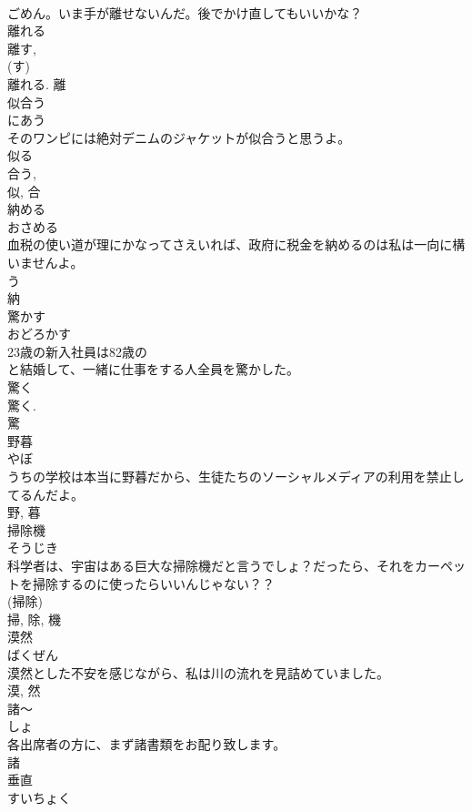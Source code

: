 \documentclass[8pt]{extreport}
\begin{document}
\begin{CJK}{UTF8}{min}
\\	ごめん。いま手が離せないんだ。後でかけ直してもいいかな？	
\\	離れる 
\\	離す, 
\\	(す) 
\\	離れる.	離	
\\	似合う	
\\	にあう	
\\	そのワンピには絶対デニムのジャケットが似合うと思うよ。	
\\	似る 
\\	合う, 
\\	似, 合	
\\	納める	
\\	おさめる	
\\	血税の使い道が理にかなってさえいれば、政府に税金を納めるのは私は一向に構いませんよ。	
\\	う 
\\	納	
\\	驚かす	
\\	おどろかす	
\\	23歳の新入社員は82歳の
\\	と結婚して、一緒に仕事をする人全員を驚かした。	
\\	驚く 
\\	驚く. 
\\	驚	
\\	野暮	
\\	やぼ	
\\	うちの学校は本当に野暮だから、生徒たちのソーシャルメディアの利用を禁止してるんだよ。	
\\	野, 暮	
\\	掃除機	
\\	そうじき	
\\	科学者は、宇宙はある巨大な掃除機だと言うでしょ？だったら、それをカーペットを掃除するのに使ったらいいんじゃない？？	
\\	(掃除) 
\\	掃, 除, 機	
\\	漠然	
\\	ばくぜん	
\\	漠然とした不安を感じながら、私は川の流れを見詰めていました。	
\\	漠, 然	
\\	諸〜	
\\	しょ	
\\	各出席者の方に、まず諸書類をお配り致します。	
\\	諸	
\\	垂直	
\\	すいちょく	

\end{CJK}
\end{document}
